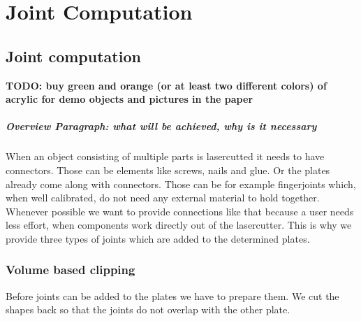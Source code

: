 \documentclass[../ClassicThesis.tex]{subfiles}
\begin{document}
\chapter{Joint Computation}\label{ch:joints}


\section{Joint computation}
\textbf{TODO: buy green and orange (or at least two different colors) of acrylic for demo objects and pictures in the paper}
\paragraph{Overview Paragraph: what will be achieved, why is it necessary}
When an object consisting of multiple parts is lasercutted it needs to have connectors. Those can be elements like screws, nails and glue. Or the plates already come along with connectors. Those can be for example fingerjoints which, when well calibrated, do not need any external material to hold together. \\
Whenever possible we want to provide connections like that because a user needs less effort, when components work directly out of the lasercutter. This is why we provide three types of joints which are added to the determined plates.

\subsection{Volume based clipping}
Before joints can be added to the plates we have to prepare them. We cut the shapes back so that the joints do not overlap with the other plate.
\end{document}
